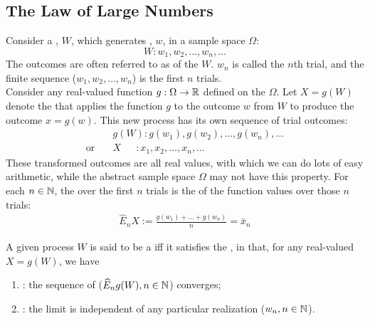 \documentclass[11pt]{article}
\numberwithin{equation}{section}
\begin{document}
\subsection{The Law of Large Numbers}
Consider a , $W$, which generates , $w$, in a sample space $\Omega$:
$$W: w_1, w_2, \hdots, w_n, \hdots$$
The outcomes are often referred to as  of the  $W$. $w_n$ is called the $n$th trial, and the finite sequence ($w_1, w_2, 
\hdots, w_n$) is the first $n$ trials. \\
Consider any real-valued function $g: \Omega \rightarrow \mathbb{R}$ defined on the  $\Omega$. Let $X = g(W)$ denote the  that applies the function $g$ to the outcome $w$ from $W$ to produce the outcome $x = g(w)$. This new process has its own sequence of trial outcomes:
\begin{align*}
	& g(W): g(w_1), g(w_2), \hdots, g(w_n), \hdots \\
    \text{or} \quad & X \quad \,\,\,  : x_1, x_2, \hdots, x_n, \hdots
\end{align*}
These transformed outcomes are all real values, with which we can do lots of easy arithmetic, while the abstract sample space $\Omega$ may not have this property.
For each $n \in \mathbb{N}$, the  over the first $n$ trials is the  of the function values over those $n$ trials:
\begin{align}
	\widehat{E}_nX := \frac{g(w_1) + \hdots + g(w_n)}{n} = \bar{x}_n
\end{align}

 A given process $W$ is said to be a  iff it satisfies the , in that, for any real-valued $X = g(W)$, we have
\begin{enumerate}
	\item {}: the sequence of  ($\widehat{E}_ng(W), n \in \mathbb{N}$) converges;
	\item {}: the limit is independent of any particular realization ($w_n, n \in \mathbb{N}$).
\end{enumerate}
\end{document}
